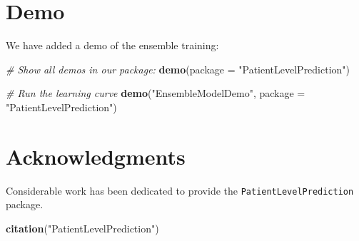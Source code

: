 \documentclass[
]{article}
\newenvironment{Shaded}{\begin{snugshade}}{\end{snugshade}}
\newcommand{\CommentTok}[1]{\textcolor[rgb]{0.56,0.35,0.01}{\textit{#1}}}
\newcommand{\DataTypeTok}[1]{\textcolor[rgb]{0.13,0.29,0.53}{#1}}
\newcommand{\KeywordTok}[1]{\textcolor[rgb]{0.13,0.29,0.53}{\textbf{#1}}}
\newcommand{\NormalTok}[1]{#1}
\newcommand{\OperatorTok}[1]{\textcolor[rgb]{0.81,0.36,0.00}{\textbf{#1}}}
\newcommand{\StringTok}[1]{\textcolor[rgb]{0.31,0.60,0.02}{#1}}
\begin{document}
\begin{Shaded}
\end{Shaded}

\hypertarget{demo}{%
\section{Demo}\label{demo}}

We have added a demo of the ensemble training:

\begin{Shaded}
\begin{Highlighting}[]
\CommentTok{# Show all demos in our package: }
 \KeywordTok{demo}\NormalTok{(}\DataTypeTok{package =} \StringTok{"PatientLevelPrediction"}\NormalTok{)}

\CommentTok{# Run the learning curve}
 \KeywordTok{demo}\NormalTok{(}\StringTok{"EnsembleModelDemo"}\NormalTok{, }\DataTypeTok{package =} \StringTok{"PatientLevelPrediction"}\NormalTok{)}
\end{Highlighting}
\end{Shaded}

\hypertarget{acknowledgments}{%
\section{Acknowledgments}\label{acknowledgments}}

Considerable work has been dedicated to provide the
\texttt{PatientLevelPrediction} package.

\begin{Shaded}
\begin{Highlighting}[]
\KeywordTok{citation}\NormalTok{(}\StringTok{"PatientLevelPrediction"}\NormalTok{)}
\end{Highlighting}
\end{Shaded}
\end{document}
